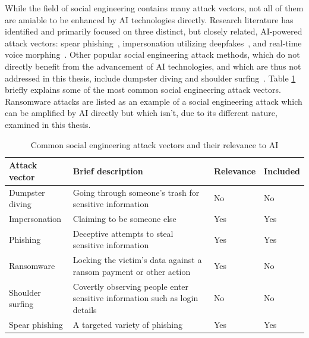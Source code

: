 %
%
While the field of social engineering contains many attack vectors, not all of them are amiable to be enhanced by AI technologies directly. Research literature has identified and primarily focused on three distinct, but closely related, AI-powered attack vectors: spear phishing~\citep{basit_Comprehensive_Survey_AI_Phishing_Detection_2021}, impersonation utilizing deepfakes~\citep{mirsky_Creation_Detection_Deepfakes_2021}, and real-time voice morphing~\citep{doan_BTSE_Audio_Deepfake_Detection_2023}. Other popular social engineering attack methods, which do not directly benefit from the advancement of AI technologies, and which are thus not addressed in this thesis, include dumpster diving and shoulder surfing~\citep{mirsky_Threat_Offensive_AI_Organizations_2023}. Table \ref{table:attacks} briefly explains some of the most common social engineering attack vectors. Ransomware attacks are listed as an example of a social engineering attack which can be amplified by AI directly but which isn’t, due to its different nature, examined in this thesis.

\begin{table}[ht!]  
\centering  
\renewcommand{\arraystretch}{1.5} %
\setlength{\tabcolsep}{5pt} %
\begin{tabularx}{\textwidth}{|l|X|l|l|} %
\hline  
\textbf{Attack vector} & \textbf{Brief description} & \textbf{Relevance} & \textbf{Included} \\ \hline  
Dumpster diving & Going through someone's trash for sensitive information & No & No \\ \hline  
Impersonation & Claiming to be someone else & Yes & Yes \\ \hline  
Phishing & Deceptive attempts to steal sensitive information & Yes & Yes \\ \hline  
Ransomware & Locking the victim's data against a ransom payment or other action & Yes & No \\ \hline  
Shoulder surfing & Covertly observing people enter sensitive information such as login details & No & No \\ \hline  
Spear phishing & A targeted variety of phishing & Yes & Yes \\ \hline  
\end{tabularx}  
\caption{Common social engineering attack vectors and their relevance to AI}  
\label{table:attacks}  
\end{table} 


